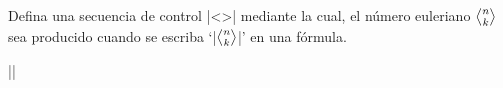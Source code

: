 
\def\euler{\atopwithdelims<>}

\bigskip

\enunciadoS Defina una secuencia de control |\euler| mediante la cual, el n\'umero euleriano ${n \euler k}$
sea producido cuando se escriba `|${n \euler k}$|' en una f\'ormula.

\bigskip

\respuestaS |\def\euler{\atopwithdelims<>}|

\bye

